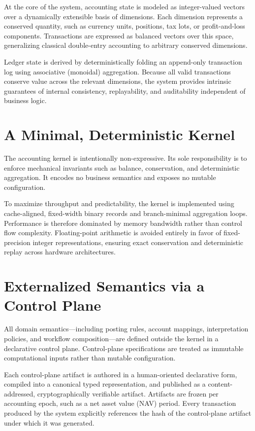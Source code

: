 \documentclass[11pt]{article}
\begin{document}
At the core of the system, accounting state is modeled as integer-valued vectors over a
dynamically extensible basis of dimensions. Each dimension represents a conserved
quantity, such as currency units, positions, tax lots, or profit-and-loss components.
Transactions are expressed as balanced vectors over this space, generalizing classical
double-entry accounting to arbitrary conserved dimensions.

Ledger state is derived by deterministically folding an append-only transaction log
using associative (monoidal) aggregation. Because all valid transactions conserve
value across the relevant dimensions, the system provides intrinsic guarantees of
internal consistency, replayability, and auditability independent of business logic.

\section{A Minimal, Deterministic Kernel}

The accounting kernel is intentionally non-expressive. Its sole responsibility is to
enforce mechanical invariants such as balance, conservation, and deterministic
aggregation. It encodes no business semantics and exposes no mutable configuration.

To maximize throughput and predictability, the kernel is implemented using
cache-aligned, fixed-width binary records and branch-minimal aggregation loops.
Performance is therefore dominated by memory bandwidth rather than control flow
complexity. Floating-point arithmetic is avoided entirely in favor of fixed-precision
integer representations, ensuring exact conservation and deterministic replay across
hardware architectures.

\section{Externalized Semantics via a Control Plane}

All domain semantics---including posting rules, account mappings, interpretation
policies, and workflow composition---are defined outside the kernel in a declarative
control plane. Control-plane specifications are treated as immutable computational
inputs rather than mutable configuration.

Each control-plane artifact is authored in a human-oriented declarative form, compiled
into a canonical typed representation, and published as a content-addressed,
cryptographically verifiable artifact. Artifacts are frozen per accounting epoch, such
as a net asset value (NAV) period. Every transaction produced by the system explicitly
references the hash of the control-plane artifact under which it was generated.
\end{document}

